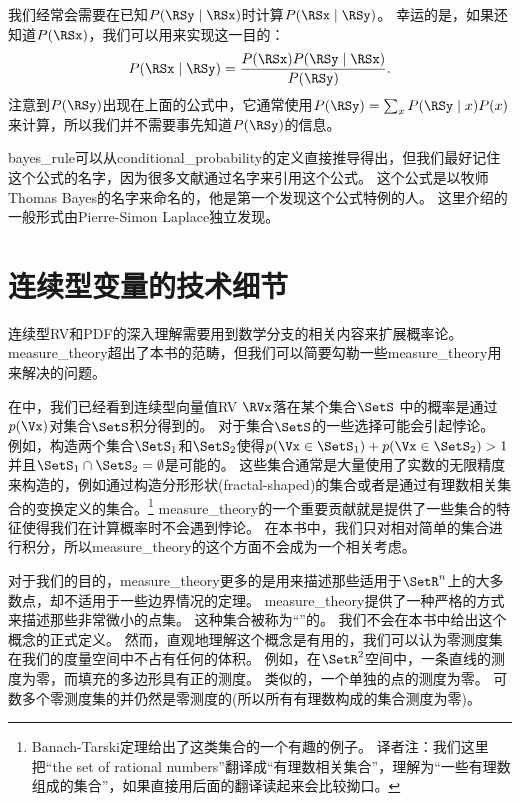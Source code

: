 \section{}
\label{sec:bayes_rule}

我们经常会需要在已知$P(\RSy \mid \RSx)$时计算$P(\RSx \mid \RSy)$。
幸运的是，如果还知道$P(\RSx)$，我们可以用来实现这一目的：
\begin{equation}
P(\RSx \mid \RSy) = \frac{P(\RSx) P(\RSy \mid \RSx)}{P(\RSy)}.
\end{equation}
注意到$P(\RSy)$出现在上面的公式中，它通常使用$P(\RSy) = \sum_x P(\RSy \mid x) P(x)$来计算，所以我们并不需要事先知道$P(\RSy)$的信息。

\gls{bayes_rule}可以从\gls{conditional_probability}的定义直接推导得出，但我们最好记住这个公式的名字，因为很多文献通过名字来引用这个公式。
这个公式是以牧师Thomas Bayes的名字来命名的，他是第一个发现这个公式特例的人。
这里介绍的一般形式由Pierre-Simon Laplace独立发现。

\section{连续型变量的技术细节}
\label{sec:technical_details_of_continuous_variables}

连续型\gls{RV}和\gls{PDF}的深入理解需要用到数学分支的相关内容来扩展概率论。
\gls{measure_theory}超出了本书的范畴，但我们可以简要勾勒一些\gls{measure_theory}用来解决的问题。

在中，我们已经看到连续型向量值\gls{RV} $\RVx$落在某个集合$\SetS$ 中的概率是通过$p(\Vx)$对集合$\SetS$积分得到的。
对于集合$\SetS$的一些选择可能会引起悖论。
例如，构造两个集合$\SetS_1$和$\SetS_2$使得$p(\Vx\in \SetS_1) + p(\Vx\in \SetS_2)>1$并且$\SetS_1 \cap \SetS_2 = \emptyset$是可能的。
这些集合通常是大量使用了实数的无限精度来构造的，例如通过构造分形形状(fractal-shaped)的集合或者是通过有理数相关集合的变换定义的集合。\footnote{Banach-Tarski定理给出了这类集合的一个有趣的例子。
译者注：我们这里把``the set of rational numbers''翻译成``有理数相关集合''，理解为``一些有理数组成的集合''，如果直接用后面的翻译读起来会比较拗口。}
\gls{measure_theory}的一个重要贡献就是提供了一些集合的特征使得我们在计算概率时不会遇到悖论。
在本书中，我们只对相对简单的集合进行积分，所以\gls{measure_theory}的这个方面不会成为一个相关考虑。


对于我们的目的，\gls{measure_theory}更多的是用来描述那些适用于$\SetR^n$上的大多数点，却不适用于一些边界情况的定理。
\gls{measure_theory}提供了一种严格的方式来描述那些非常微小的点集。
这种集合被称为``''的。
我们不会在本书中给出这个概念的正式定义。
然而，直观地理解这个概念是有用的，我们可以认为零测度集在我们的度量空间中不占有任何的体积。
例如，在$\SetR^2$空间中，一条直线的测度为零，而填充的多边形具有正的测度。
类似的，一个单独的点的测度为零。
可数多个零测度集的并仍然是零测度的(所以所有有理数构成的集合测度为零)。

